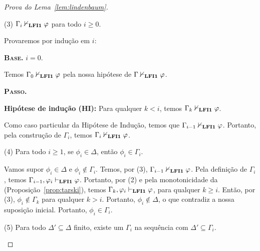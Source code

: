 \begin{proof}[Prova do Lema~\ref{lem:lindenbaum}]
\begin{adjustwidth}{1cm}{}
\begin{adjustwidth}{1cm}{}
            \end{adjustwidth}

            \noindent(3) $\Gamma_i \nvdash_{{\normalfont\textbf{LFI1}}{}} \varphi$ para todo $i \geq 0$.

            Provaremos por indução em $i$:

            \begin{adjustwidth}{1cm}{}
                \noindent\textbf{\textsc{Base.}} $i = 0$.
                
                \begin{adjustwidth}{1cm}{}
                    
                    Temos $\Gamma_0 \nvdash_{{\normalfont\textbf{LFI1}}{}} \varphi$ pela nossa hipótese de $\Gamma \nvdash_{{\normalfont\textbf{LFI1}}{}} \varphi$.
                    
                \end{adjustwidth}
                
                \noindent\textbf{\textsc{Passo.}} 
                
                \noindent\textbf{Hipótese de indução (HI):} Para qualquer $k < i$, temos $\Gamma_k \nvdash_{{\normalfont\textbf{LFI1}}{}} \varphi$.
                
                    Como caso particular da Hipótese de Indução, temos que $\Gamma_{i-1} \nvdash_{{\normalfont\textbf{LFI1}}{}} \varphi$. Portanto, pela construção de $\Gamma_i$, temos $\Gamma_i \nvdash_{{\normalfont\textbf{LFI1}}{}} \varphi$.
                    
            \end{adjustwidth}

            
            \noindent(4) Para todo $i \geq 1$, se $\phi_i \in \Delta$, então $\phi_i \in \Gamma_i$.

            \begin{adjustwidth}{1cm}{}


                Vamos supor $\phi_i \in \Delta$ e $\phi_i \not \in \Gamma_i$. Temos, por (3), $\Gamma_{i - 1} \nvdash_{{\normalfont\textbf{LFI1}}{}} \varphi$. Pela definição de $\Gamma_i$, temos $\Gamma_{i - 1}, \varphi_i \vdash_{{\normalfont\textbf{LFI1}}{}} \varphi$. Portanto, por (2) e pela monotonicidade da \lfium{} (Proposição~\ref{prop:tarski}), temos $\Gamma_k, \varphi_i \vdash_{{\normalfont\textbf{LFI1}}{}} \varphi$, para qualquer $k \geq i$. Então, por (3), $\phi_i \not \in \Gamma_k$ para qualquer $k > i$. Portanto, $\phi_i \not \in \Delta$, o que contradiz a nossa suposição inicial. Portanto, $\phi_i \in \Gamma_i$.

            \end{adjustwidth}

            \noindent(5) Para todo $\Delta' \subseteq \Delta$ finito, existe um $\Gamma_i$ na sequência com $\Delta' \subseteq \Gamma_i$.


\end{adjustwidth}
\end{proof}
